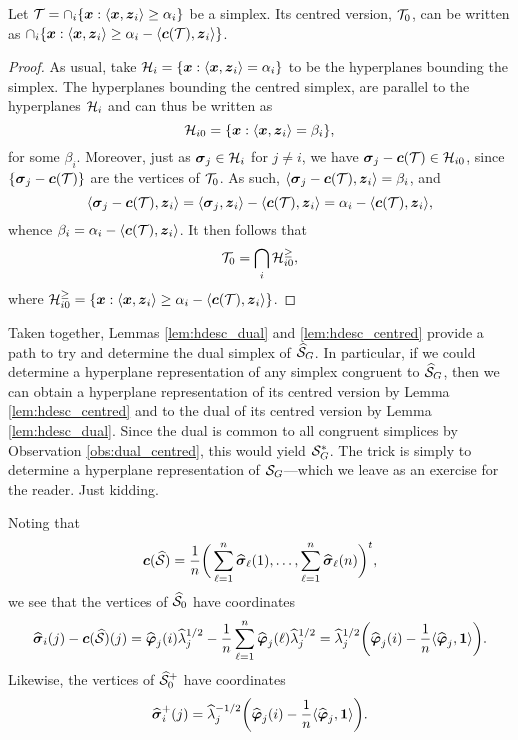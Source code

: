 \begin{lemma}
	\label{lem:hdesc_centred}
	Let $\mathcal{T}=\cap_i \{\vb*{x}:\langle \vb*{x},\vb*{z}_i\rangle \geq \alpha_i\}$ be a simplex. Its centred version, $\mathcal{T}_0$, can be written as $\cap_i \{\vb*{x}:\langle \vb*{x},\vb*{z}_i\rangle \geq \alpha_i - \langle \vb*{c}(\mathcal{T}),\vb*{z}_i\rangle\}$. 
\end{lemma}
\begin{proof}
	As usual, take $\mathcal{H}_i = \{\vb*{x}:\langle \vb*{x},\vb*{z}_i\rangle = \alpha_i\}$ to be the hyperplanes bounding the simplex. The hyperplanes bounding the centred simplex, are parallel to the hyperplanes $\mathcal{H}_i$ and can thus be written as 
	\[\mathcal{H}_{i0} = \{\vb*{x}:\langle \vb*{x},\vb*{z}_i\rangle = \beta_i\},\]
	for some $\beta_i$. Moreover, just as $\vb*{\sigma}_j\in\mathcal{H}_i$ for $j\neq i$, we have $\vb*{\sigma}_j-\vb*{c}(\mathcal{T})\in \mathcal{H}_{i0}$, since $\{\vb*{\sigma}_j-\vb*{c}(\mathcal{T})\}$ are the vertices of $\mathcal{T}_0$. As such, $\langle \vb*{\sigma}_j-\vb*{c}(\mathcal{T}),\vb*{z}_i\rangle=\beta_i$, and 
	\[\langle \vb*{\sigma}_j-\vb*{c}(\mathcal{T}),\vb*{z}_i\rangle = \langle \vb*{\sigma}_j,\vb*{z}_i\rangle - \langle\vb*{c}(\mathcal{T}),\vb*{z}_i\rangle = \alpha_i - \langle\vb*{c}(\mathcal{T}),\vb*{z}_i\rangle,\]
	whence $\beta_i = \alpha_i - \langle\vb*{c}(\mathcal{T}),\vb*{z}_i\rangle$. It then follows that 
	\[\mathcal{T}_0=\bigcap_i \mathcal{H}_{i0}^{\geq },\]
	where $\mathcal{H}_{i0}^\geq = \{\vb*{x}:\langle \vb*{x},\vb*{z}_i\rangle \geq  \alpha_i - \langle \vb*{c}(\mathcal{T}),
	\vb*{z}_i\rangle\}$. 
\end{proof}

Taken together, Lemmas \ref{lem:hdesc_dual} and \ref{lem:hdesc_centred} provide a path to try and determine the dual simplex of $\widehat{\mathcal{S}}_G$. In particular, if we could determine a hyperplane representation of any simplex congruent to $\widehat{\mathcal{S}}_G$,  then we can obtain a hyperplane representation of its centred version by Lemma \ref{lem:hdesc_centred} and to the dual of its centred version by Lemma \ref{lem:hdesc_dual}. Since the dual is common to all congruent simplices by Observation \ref{obs:dual_centred}, this would yield $\mathcal{S}_G^*$. The trick is simply to determine a hyperplane representation of $\mathcal{S}_G$---which we leave as an exercise for the reader. Just kidding. 

 

Noting that 
\begin{equation*}
\vb*{c}(\widehat{\mathcal{S}}) = \frac{1}{n}\bigg(\sum_{\ell=1}^n \widehat{\vb*{\sigma}}_\ell(1),\dots,\sum_{\ell=1}^n \widehat{\vb*{\sigma}}_\ell(n)\bigg)^t,
\end{equation*}
we see that the vertices of $\widehat{\mathcal{S}}_0$ have coordinates
\begin{equation*}
\widehat{\vb*{\sigma}}_i(j) - \vb*{c}(\widehat{\mathcal{S}})(j) = \widehat{\vb*{\varphi}}_j(i)\widehat{\lambda}_j^{1/2} - \frac{1}{n}\sum_{\ell=1}^n \widehat{\vb*{\varphi}}_j(\ell)\widehat{\lambda}_j^{1/2} = \widehat{\lambda}_j^{1/2} \bigg(\widehat{\vb*{\varphi}}_j(i) - \frac{1}{n}\langle \widehat{\vb*{\varphi}}_j,\vb{1}\rangle \bigg).
\end{equation*}
Likewise, the vertices of $\widehat{\mathcal{S}}_0^+$ have coordinates 
\begin{equation*}
\widehat{\vb*{\sigma}}_i^+(j) = \widehat{\lambda}_j^{-1/2}\bigg(\widehat{\vb*{\varphi}}_j(i) - \frac{1}{n}\langle \widehat{\vb*{\varphi}}_j,\vb{1}\rangle\bigg).
\end{equation*}

